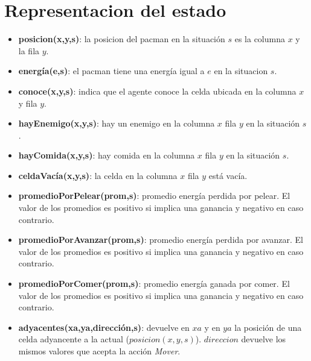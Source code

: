 \section{Representacion del estado}

\begin{itemize}

\item \textbf{posicion(x,y,s)}: la posicion del pacman en la situación $s$ es
la columna $x$ y la fila $y$.

\item \textbf{energía(e,s)}: el pacman tiene una energía igual a $e$ en la
situacion $s$.

\item \textbf{conoce(x,y,s)}: indica que el agente conoce la celda ubicada
en la columna $x$ y fila $y$.

\item \textbf{hayEnemigo(x,y,s)}: hay un enemigo en la columna $x$ fila $y$ en
la situación $s$.

\item \textbf{hayComida(x,y,s)}: hay comida en la columna $x$ fila $y$ en la
situación $s$.

\item \textbf{celdaVacía(x,y,s)}: la celda en la columna $x$ fila $y$ está
vacía.

\item \textbf{promedioPorPelear(prom,s)}: promedio energía perdida por pelear.
El valor de los promedios es positivo si implica una ganancia y negativo en
caso contrario.

\item \textbf{promedioPorAvanzar(prom,s)}: promedio energía perdida por
avanzar. El valor de los promedios es positivo si implica una ganancia y
negativo en caso contrario.

\item \textbf{promedioPorComer(prom,s)}: promedio energía ganada por comer. El
valor de los promedios es positivo si implica una ganancia y negativo en caso
contrario.

\item \textbf{adyacentes(xa,ya,dirección,s)}: devuelve en $xa$ y en $ya$ la
posición de una celda adyancente a la actual ($posicion(x,y,s)$). $direccion$
devuelve los mismos valores que acepta la acción \emph{Mover}.

\end{itemize}
